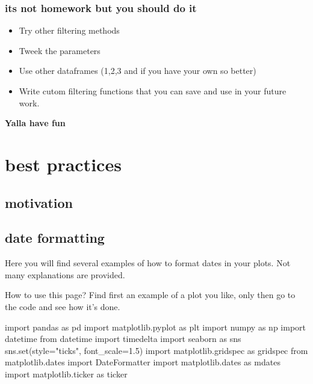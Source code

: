\documentclass[
  letterpaper,
  DIV=11,
  numbers=noendperiod,
  oneside]{scrreprt}
\newenvironment{Shaded}{\begin{snugshade}}{\end{snugshade}}
\newcommand{\BuiltInTok}[1]{\textcolor[rgb]{0.00,0.23,0.31}{#1}}
\newcommand{\FloatTok}[1]{\textcolor[rgb]{0.68,0.00,0.00}{#1}}
\newcommand{\ImportTok}[1]{\textcolor[rgb]{0.00,0.46,0.62}{#1}}
\newcommand{\NormalTok}[1]{\textcolor[rgb]{0.00,0.23,0.31}{#1}}
\newcommand{\OperatorTok}[1]{\textcolor[rgb]{0.37,0.37,0.37}{#1}}
\newcommand{\StringTok}[1]{\textcolor[rgb]{0.13,0.47,0.30}{#1}}
\providecommand{\tightlist}{%
  \setlength{\itemsep}{0pt}\setlength{\parskip}{0pt}}\usepackage{longtable,booktabs,array}
\begin{document}
\hypertarget{its-not-homework-but-you-should-do-it}{%
\section{its not homework but you should do
it}\label{its-not-homework-but-you-should-do-it}}

\begin{itemize}
\tightlist
\item
  Try other filtering methods
\item
  Tweek the parameters
\item
  Use other dataframes (1,2,3 and if you have your own so better)
\item
  Write cutom filtering functions that you can save and use in your
  future work.
\end{itemize}

\textbf{Yalla have fun}

\part{best practices}

\hypertarget{motivation-3}{%
\chapter{motivation}\label{motivation-3}}

\hypertarget{date-formatting}{%
\chapter{date formatting}\label{date-formatting}}

Here you will find several examples of how to format dates in your
plots. Not many explanations are provided.

How to use this page? Find first an example of a plot you like, only
then go to the code and see how it's done.

\begin{Shaded}
\begin{Highlighting}[]
\ImportTok{import}\NormalTok{ pandas }\ImportTok{as}\NormalTok{ pd}
\ImportTok{import}\NormalTok{ matplotlib.pyplot }\ImportTok{as}\NormalTok{ plt}
\ImportTok{import}\NormalTok{ numpy }\ImportTok{as}\NormalTok{ np}
\ImportTok{import}\NormalTok{ datetime}
\ImportTok{from}\NormalTok{ datetime }\ImportTok{import}\NormalTok{ timedelta}
\ImportTok{import}\NormalTok{ seaborn }\ImportTok{as}\NormalTok{ sns}
\NormalTok{sns.}\BuiltInTok{set}\NormalTok{(style}\OperatorTok{=}\StringTok{"ticks"}\NormalTok{, font\_scale}\OperatorTok{=}\FloatTok{1.5}\NormalTok{)}
\ImportTok{import}\NormalTok{ matplotlib.gridspec }\ImportTok{as}\NormalTok{ gridspec}
\ImportTok{from}\NormalTok{ matplotlib.dates }\ImportTok{import}\NormalTok{ DateFormatter}
\ImportTok{import}\NormalTok{ matplotlib.dates }\ImportTok{as}\NormalTok{ mdates}
\ImportTok{import}\NormalTok{ matplotlib.ticker }\ImportTok{as}\NormalTok{ ticker}
\end{Highlighting}
\end{Shaded}
\end{document}
